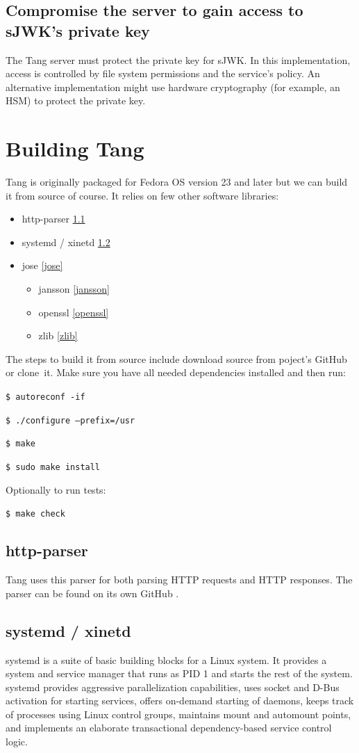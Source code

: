 \subsection{Compromise the server to gain access to sJWK's private key}
The Tang server must protect the private key for sJWK.
In this implementation, access is controlled by file system permissions and the service's policy.
An alternative implementation might use hardware cryptography (for example, an HSM) to protect the private key.
\section{Building Tang}

Tang is originally packaged for Fedora OS version 23 and later but we can build it from source of course.
It relies on few other software libraries:
\label{dependencies}
\begin{itemize}
\item http-parser \ref{http-parser}
\item systemd / xinetd \ref{systemd}
\item jose \ref{jose}
    \begin{itemize}
    \item jansson \ref{jansson}
    \item openssl \ref{openssl}
    \item zlib \ref{zlib}
    \end{itemize}
\end{itemize}

The steps to build it from source include download source from poject's GitHub or clone~it.
Make sure you have all needed dependencies installed and then run:

{\tt \$ autoreconf -if}

{\tt \$ ./configure --prefix=/usr}

{\tt \$ make}

{\tt \$ sudo make install}

Optionally to run tests:

{\tt \$ make check}

\subsection{http-parser}\label{http-parser}
Tang uses this parser for both parsing HTTP requests and HTTP responses.
The parser can be found on its own GitHub \cite{http-parser}.

\subsection{systemd / xinetd}\label{systemd}
systemd is a suite of basic building blocks for a Linux system.
It provides a system and service manager that runs as PID 1 and starts the rest of the system.
systemd provides aggressive parallelization capabilities, uses socket and D-Bus activation for starting services,
 offers on-demand starting of daemons, keeps track of processes using Linux control groups, maintains mount and automount points,
 and implements an elaborate transactional dependency-based service control logic.

